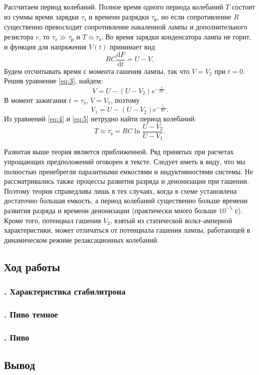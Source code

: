 \documentclass[a4paper, 12pt]{article}
\begin{document}
Рассчитаем период колебаний. Полное время одного периода колебаний $T$ состоит
из суммы времи зарядки $\tau_{з}$ и времени разрядки $\tau_{р}$, но если сопротивление
$R$ существенно превосходит сопротивление накаленной лампы и дополнительного
резистора $r$, то $\tau_{з} \gg \tau_{р}$ и $T \approx \tau_{з}$. Во время зарядки конденсатора
лампа не горит, и функция для напряжения $V(t)$ принимает вид
\begin{equation}
\label{eq:3}
RC \frac{\mathrm{d}F}{\mathrm{d}t }=U-V.
\end{equation}
Будем отсчитывать время с момента гашения лампы, так что $V=V_2$ при
$t=0$. Решив уравнение \eqref{eq:3}, найдем:
\begin{equation}
\label{eq:4}
V=U-\left( U-V_2 \right)e^{-\frac{ t }{ RC}}.
\end{equation}
В момент зажигания $t=\tau_{з}$, $V=V_1$, поэтому
\begin{equation}
\label{eq:5}
V_1=U- \left( U-V_2 \right)e^{-\frac{ \tau_{з} }{ RC}}.
\end{equation}
Из уравнений \eqref{eq:4} и \eqref{eq:5} нетрудно найти период колебаний:
\begin{equation}
\label{eq:6}
T \approx \tau_{з} = RC\ln \frac{ U-V_2 }{ U-V_1}.
\end{equation}

Развитая выше теория является приближенной. Ряд принятых при расчетах упрощающих
предположений оговорен в тексте. Следует иметь в виду, что мы полностью
пренебрегли паразитными емкостями и индуктивностями системы. Не рассматривались
также процессы развития разряда и деионизации при гашении. Поэтому теория
справедлива лишь в тех случаях, когда в схеме установлена достаточно большая
емкость, а период колебаний существенно больше времени развития разряда и
времени деионизации (практически много больше $10^{-5}$ с). Кроме того,
потенциал гашения $V_2$, взятый из статической вольт-амперной характеристики,
может отличаться от потенциала гашения лампы, работающей в динамическом режиме
релаксационных колебаний.
\subsection*{{Ход работы}}
\subsubsection*{. Характеристика стабилитрона}

\subsubsection*{. Пиво темное}
\lipsum[3-5]

\subsubsection*{. Пиво }
\lipsum[6-6]

\subsection*{{Вывод}}
\lipsum[7-7]
\end{document}
